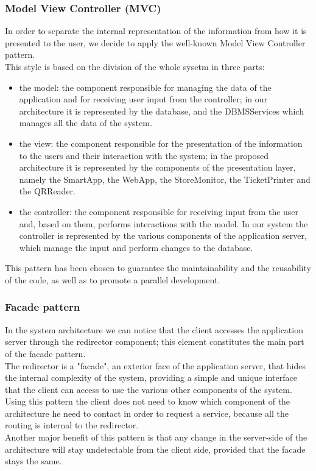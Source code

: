 \subsubsection{Model View Controller (MVC)}
In order to separate the internal representation of the information from how it is presented to the user, we decide to apply the well-known Model View Controller pattern.\\
This style is based on the division of the whole sysetm in three parts:
\begin{itemize}
	\item the model: the component responsible for managing the data of the application and for receiving user input from the controller; in our architecture it is represented by the database, and the DBMSServices which manages all the data of the system.
	\item the view: the component responsible for the presentation of the information to the users and their interaction with the system; in the proposed architecture it is represented by the components of the presentation layer, namely the SmartApp, the WebApp, the StoreMonitor, the TicketPrinter and the QRReader.
	\item the controller: the component responsible for receiving input from the user and, based on them, performs interactions with the model. In our system the controller is represented by the various components of the application server, which manage the input and perform changes to the database.
\end{itemize}
This pattern has been chosen to guarantee the maintainability and the reusability of the code, as well as to promote a parallel development.
\subsubsection{Facade pattern}
In the system architecture we can notice that the client accesses the application server through the redirector component; this element constitutes the main part of the facade pattern.\\ The redirector is a "facade", an exterior face of the application server, that hides the internal complexity of the system, providing a simple and unique interface that the client can access to use the various other components of the system.\\
Using this pattern the client does not need to know which component of the architecture he need to contact in order to request a service, because all the routing is internal to the redirector.\\
Another major benefit of this pattern is that any change in the server-side of the architecture will stay undetectable from the client side, provided that the facade stays the same.
